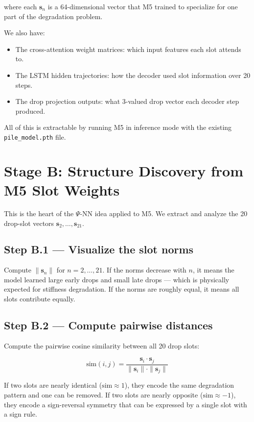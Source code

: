 \documentclass[11pt,a4paper]{article}
\begin{document}
where each $\mathbf{s}_n$ is a 64-dimensional vector that M5 trained to specialize for one part of the degradation problem.

We also have:
\begin{itemize}[nosep]
    \item The cross-attention weight matrices: which input features each slot attends to.
    \item The LSTM hidden trajectories: how the decoder used slot information over 20 steps.
    \item The drop projection outputs: what 3-valued drop vector each decoder step produced.
\end{itemize}

All of this is extractable by running M5 in inference mode with the existing \texttt{pile\_model.pth} file.

\section{Stage B: Structure Discovery from M5 Slot Weights}

This is the heart of the $\Psi$-NN idea applied to M5. We extract and analyze the 20 drop-slot vectors $\mathbf{s}_2, \ldots, \mathbf{s}_{21}$.

\subsection*{Step B.1 --- Visualize the slot norms}

Compute $\|\mathbf{s}_n\|$ for $n = 2, \ldots, 21$. If the norms decrease with $n$, it means the model learned large early drops and small late drops --- which is physically expected for stiffness degradation. If the norms are roughly equal, it means all slots contribute equally.

\subsection*{Step B.2 --- Compute pairwise distances}

Compute the pairwise cosine similarity between all 20 drop slots:

$$
\text{sim}(i, j) = \frac{\mathbf{s}_i \cdot \mathbf{s}_j}{\|\mathbf{s}_i\| \cdot \|\mathbf{s}_j\|}
$$

If two slots are nearly identical ($\text{sim} \approx 1$), they encode the same degradation pattern and one can be removed. If two slots are nearly opposite ($\text{sim} \approx -1$), they encode a sign-reversal symmetry that can be expressed by a single slot with a sign rule.
\end{document}
